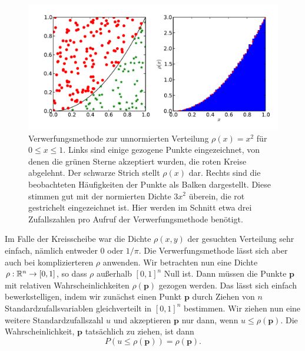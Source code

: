 \begin{figure}
  \centering
  \includegraphics[width=\textwidth]{plots/rejection}
  \caption{Verwerfungsmethode zur unnormierten Verteilung
    $\rho(x)=x^2$ für $0\le x \le 1$. Links sind einige gezogene
    Punkte eingezeichnet, von denen die grünen Sterne akzeptiert
    wurden, die roten Kreise abgelehnt. Der schwarze Strich stellt
    $\rho(x)$ dar. Rechts sind die beobachteten Häufigkeiten der
    Punkte als Balken dargestellt. Diese stimmen gut mit der
    normierten Dichte $3x^2$ überein, die rot gestrichelt
    eingezeichnet ist. Hier werden im Schnitt etwa drei Zufallszahlen
    pro Aufruf der Verwerfungsmethode benötigt.}
  \label{fig:rejection}
\end{figure}

Im Falle der Kreisscheibe war die Dichte $\rho(x, y)$ der gesuchten
Verteilung sehr einfach, nämlich entweder $0$ oder $1/\pi$. Die
Verwerfungsmethode lässt sich aber auch bei komplizierteren $\rho$
anwenden. Wir betrachten nun eine Dichte $\rho:\mathbb{R}^n\to [0,1]$, so
dass $\rho$ außerhalb $[0,1]^n$ Null ist. Dann müssen die Punkte
$\mathbf p$ mit relativen Wahrscheinlichkeiten $\rho(\mathbf p)$
gezogen werden. Das lässt sich einfach bewerkstelligen, indem wir
zunächst einen Punkt $\mathbf p$ durch Ziehen von $n$
Standardzufallsvariablen gleichverteilt in $[0,1]^n$ bestimmen. Wir
ziehen nun eine weitere Standardzufallszahl $u$ und akzeptieren
$\mathbf p$ nur dann, wenn $u\le\rho(\mathbf p)$. Die
Wahrscheinlichkeit, $\mathbf p$ tatsächlich zu ziehen, ist dann
\begin{equation}
  P(u \le\rho(\mathbf p)) = \rho(\mathbf p).
\end{equation}

